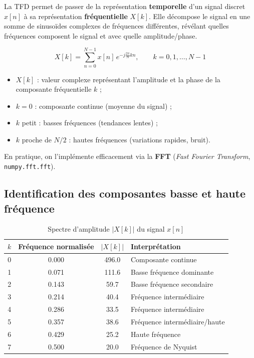 \documentclass[11pt,a4paper]{article}
\begin{document}
La TFD permet de passer de la représentation \textbf{temporelle} d'un signal discret $x[n]$ à sa représentation \textbf{fréquentielle} $X[k]$. Elle décompose le signal en une somme de sinusoïdes complexes de fréquences différentes, révélant quelles fréquences composent le signal et avec quelle amplitude/phase.

\[
X[k] = \sum_{n=0}^{N-1} x[n] \, e^{-j\frac{2\pi}{N}kn}, \qquad k = 0, 1, \dots, N-1
\]

\begin{itemize}[label=--]
    \item $X[k]$ : valeur complexe représentant l'amplitude et la phase de la composante fréquentielle $k$ ;
    \item $k=0$ : composante continue (moyenne du signal) ;
    \item $k$ petit : basses fréquences (tendances lentes) ;
    \item $k$ proche de $N/2$ : hautes fréquences (variations rapides, bruit).
\end{itemize}

En pratique, on l'implémente efficacement via la \textbf{FFT} (\emph{Fast Fourier Transform}, \texttt{numpy.fft.fft}).

\subsection{Identification des composantes basse et haute fréquence}

\begin{table}[H]
    \centering
    \caption{Spectre d'amplitude $|X[k]|$ du signal $x[n]$}
    \label{tab:spectre}
    \begin{tabular}{@{}cccl@{}}
        \toprule
        $k$ & Fréquence normalisée & $|X[k]|$ & Interprétation \\
        \midrule
        0 & 0.000 & 496.0 & Composante continue \\
        1 & 0.071 & 111.6 & Basse fréquence dominante \\
        2 & 0.143 & 59.7  & Basse fréquence secondaire \\
        3 & 0.214 & 40.4  & Fréquence intermédiaire \\
        4 & 0.286 & 33.5  & Fréquence intermédiaire \\
        5 & 0.357 & 38.6  & Fréquence intermédiaire/haute \\
        6 & 0.429 & 25.2  & Haute fréquence \\
        7 & 0.500 & 20.0  & Fréquence de Nyquist \\
        \bottomrule
    \end{tabular}
\end{table}
\end{document}
